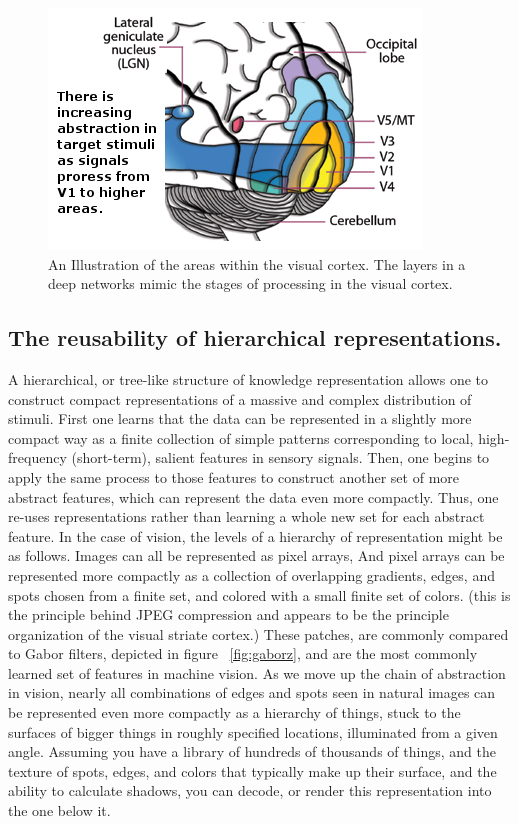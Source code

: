 \documentclass[12pt]{article}
\begin{document}
\begin{doublespacing}
\begin{figure}[p]
\centering
\includegraphics[scale=0.8]{visual_cortex}
\caption{An Illustration of the areas within the visual cortex. The layers in a deep networks mimic the stages of processing in the visual cortex.}
\end{figure}
		
	\subsection{The reusability of hierarchical representations.}
	A hierarchical, or tree-like structure of knowledge representation allows one to construct compact representations of a massive and complex distribution of stimuli. First one learns that the data can be represented in a slightly more compact way as a finite collection of simple patterns corresponding to local, high-frequency (short-term), salient features in sensory signals. Then, one begins to apply the same process to those features to construct another set of more abstract features, which can represent the data even more compactly. Thus, one re-uses representations rather than learning a whole new set for each abstract feature.
	In the case of vision, the levels of a hierarchy of representation might be as follows. Images can all be represented as pixel arrays, And pixel arrays can be represented more compactly as a collection of overlapping gradients, edges, and spots chosen from a finite set, and colored with a small finite set of colors. (this is the principle behind JPEG compression and appears to be the principle organization of the visual striate cortex.) These patches, are commonly compared to Gabor filters, depicted in figure ~\ref{fig:gaborz}, and are the most commonly learned set of features in machine vision. As we move up the chain of abstraction in vision, nearly all combinations of edges and spots seen in natural images can be represented even more compactly as a hierarchy of things, stuck to the surfaces of bigger things in roughly specified locations, illuminated from a given angle. Assuming you have a library of hundreds of thousands of things, and the texture of spots, edges, and colors that typically make up their surface, and the ability to calculate shadows, you can decode, or render this representation into the one below it.


\end{doublespacing}
\end{document}
